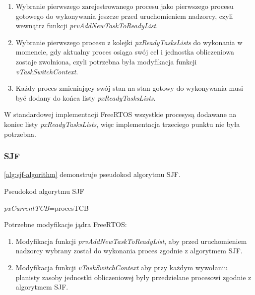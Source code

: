 \documentclass[../../main]{subfiles}
\begin{document}
\begin{enumerate}
    \item Wybranie pierwszego zarejestrowanego procesu jako pierwszego procesu gotowego do wykonywania jeszcze przed uruchomieniem nadzorcy, czyli wewnątrz funkcji \textit{prvAddNewTaskToReadyList}.
    \item Wybranie pierwszego procesu z kolejki \textit{pxReadyTasksLists} do wykonania w momencie, gdy aktualny proces osiąga swój cel i jednostka obliczeniowa zostaje zwolniona, czyli potrzebna była modyfikacja funkcji \textit{vTaskSwitchContext}.
    \item Każdy proces zmieniający swój stan na stan gotowy do wykonywania musi być dodany do końca listy \textit{pxReadyTasksLists}.
\end{enumerate}

W standardowej implementacji FreeRTOS wszystkie procesysą dodawane na koniec listy \textit{pxReadyTasksLists}, więc implementacja trzeciego punktu nie była potrzebna.

\subsubsection{SJF}

\cref{alg:sjf-algorithm} demonstruje pseudokod algorytmu SJF.

\begin{algorithm}
\caption{Pseudokod algorytmu SJF}\label{alg:sjf-algorithm}
\begin{algorithmic}[1]
        \State \textit{pxCurrentTCB}=procesTCB
    \EndIf
\EndFor
\end{algorithmic}
\end{algorithm}

Potrzebne modyfikacje jądra FreeRTOS:

\begin{enumerate}
    \item Modyfikacja funkcji \textit{prvAddNewTaskToReadyList}, aby przed uruchomieniem nadzorcy wybrany został do wykonania proces zgodnie z algorytmem SJF.
    \item Modyfikacja funkcji \textit{vTaskSwitchContext} aby przy każdym wywołaniu planisty zasoby jednostki obliczeniowej były przedzielane procesowi zgodnie z algorytmem SJF.
\end{enumerate}
\end{document}
